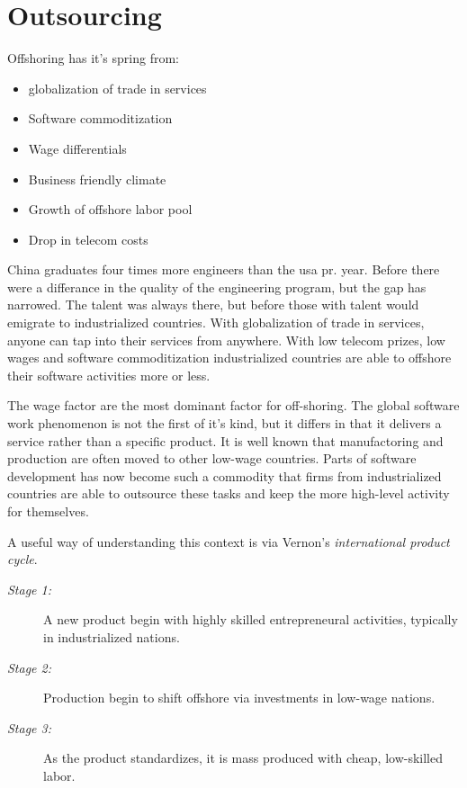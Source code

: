 \section{Outsourcing}
Offshoring has it's spring from:

\begin{itemize}
\item globalization of trade in services
\item Software commoditization
\item Wage differentials
\item Business friendly climate 
\item Growth of offshore labor pool
\item Drop in telecom costs
\end{itemize}

China graduates four times more engineers than the \gls{usa} pr. year. 
Before there were a differance in the quality of the engineering program, but the gap has narrowed. 
The talent was always there, but before those with talent would emigrate to industrialized countries. 
With globalization of trade in services, anyone can tap into their services from anywhere. 
With low telecom prizes, low wages and software commoditization industrialized countries are able to offshore their software activities more or less. 

The wage factor are the most dominant factor for off-shoring.
The global software work phenomenon is not the first of it's kind, but it differs in that it delivers a service rather than a specific product. 
It is well known that manufactoring and production are often moved to other low-wage countries.
Parts of software development has now become such a commodity that firms from industrialized countries are able to outsource these tasks and keep the more high-level activity for themselves. 

A useful way of understanding this context is via Vernon's \textit{international product cycle}.
\begin{description}
\item[\textit{Stage 1:}]\hfill
A new product begin with highly skilled entrepreneural activities, typically in industrialized nations.
\item[\textit{Stage 2:}]\hfill
Production begin to shift offshore via investments in low-wage nations.
\item[\textit{Stage 3:}]\hfill
As the product standardizes, it is mass produced with cheap, low-skilled labor.
\end{description}


